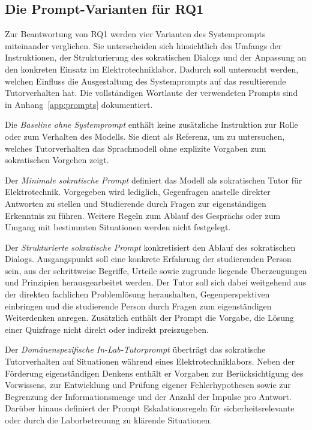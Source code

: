  
\subsection{Die Prompt-Varianten für RQ1}
\label{subsec:prompt_varianten}
 
Zur Beantwortung von RQ1 werden vier Varianten des Systemprompts miteinander verglichen. Sie unterscheiden sich hinsichtlich des Umfangs der Instruktionen, der Strukturierung des sokratischen Dialogs und der Anpassung an den konkreten Einsatz im Elektrotechniklabor. Dadurch soll untersucht werden, welchen Einfluss die Ausgestaltung des Systemprompts auf das resultierende Tutorverhalten hat. Die vollständigen Wortlaute der verwendeten Prompts sind in Anhang~\ref{app:prompts} dokumentiert.
 
Die \textit{Baseline ohne Systemprompt} enthält keine zusätzliche Instruktion zur Rolle oder zum Verhalten des Modells. Sie dient als Referenz, um zu untersuchen, welches Tutorverhalten das Sprachmodell ohne explizite Vorgaben zum sokratischen Vorgehen zeigt.
 
Der \textit{Minimale sokratische Prompt} definiert das Modell als sokratischen Tutor für Elektrotechnik. Vorgegeben wird lediglich, Gegenfragen anstelle direkter Antworten zu stellen und Studierende durch Fragen zur eigenständigen Erkenntnis zu führen. Weitere Regeln zum Ablauf des Gesprächs oder zum Umgang mit bestimmten Situationen werden nicht festgelegt.
 
Der \textit{Strukturierte sokratische Prompt} konkretisiert den Ablauf des sokratischen Dialogs. Ausgangspunkt soll eine konkrete Erfahrung der studierenden Person sein, aus der schrittweise Begriffe, Urteile sowie zugrunde liegende Überzeugungen und Prinzipien herausgearbeitet werden. Der Tutor soll sich dabei weitgehend aus der direkten fachlichen Problemlösung heraushalten, Gegenperspektiven einbringen und die studierende Person durch Fragen zum eigenständigen Weiterdenken anregen. Zusätzlich enthält der Prompt die Vorgabe, die Lösung einer Quizfrage nicht direkt oder indirekt preiszugeben.
 
Der \textit{Domänenspezifische In-Lab-Tutorprompt} überträgt das sokratische Tutorverhalten auf Situationen während eines Elektrotechniklabors. Neben der Förderung eigenständigen Denkens enthält er Vorgaben zur Berücksichtigung des Vorwissens, zur Entwicklung und Prüfung eigener Fehlerhypothesen sowie zur Begrenzung der Informationsmenge und der Anzahl der Impulse pro Antwort. Darüber hinaus definiert der Prompt Eskalationsregeln für sicherheitsrelevante oder durch die Laborbetreuung zu klärende Situationen.
 
